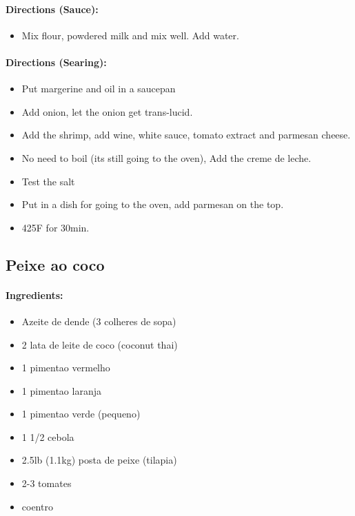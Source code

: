 \documentclass{article}
\begin{document}
\paragraph{Directions (Sauce):}
\begin{itemize}
    \item Mix flour, powdered milk and mix well. Add water.
\end{itemize}  

\paragraph{Directions (Searing):}
\begin{itemize}
    \item Put margerine and oil in a saucepan
    \item Add onion, let the onion get trans-lucid.
    \item Add the shrimp, add wine, white sauce, tomato extract and parmesan cheese.
    \item No need to boil (its still going to the oven), Add the creme de leche.
    \item Test the salt
    \item Put in a dish for going to the oven, add parmesan on the top.
    \item 425F for 30min.
\end{itemize} 

\subsection{Peixe ao coco}

\paragraph{Ingredients:}
\begin{itemize}
    \item Azeite de dende (3 colheres de sopa)
    \item 2 lata de leite de coco (coconut thai)
    \item 1 pimentao vermelho
    \item 1 pimentao laranja
    \item 1 pimentao verde (pequeno)
    \item 1 1/2 cebola
    \item 2.5lb (1.1kg) posta de peixe (tilapia)
    \item 2-3 tomates
    \item coentro
\end{itemize}
\end{document}
